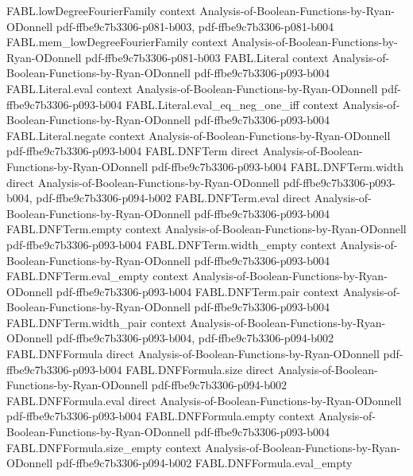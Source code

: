 \begin{theorem}
\proofstep
  {FABL.lowDegreeFourierFamily}
  {context}
  {Analysis-of-Boolean-Functions-by-Ryan-ODonnell}
  {pdf-ffbe9c7b3306-p081-b003,
    pdf-ffbe9c7b3306-p081-b004}
\proofstep
  {FABL.mem_lowDegreeFourierFamily}
  {context}
  {Analysis-of-Boolean-Functions-by-Ryan-ODonnell}
  {pdf-ffbe9c7b3306-p081-b003}
\proofstep
  {FABL.Literal}
  {context}
  {Analysis-of-Boolean-Functions-by-Ryan-ODonnell}
  {pdf-ffbe9c7b3306-p093-b004}
\proofstep
  {FABL.Literal.eval}
  {context}
  {Analysis-of-Boolean-Functions-by-Ryan-ODonnell}
  {pdf-ffbe9c7b3306-p093-b004}
\proofstep
  {FABL.Literal.eval_eq_neg_one_iff}
  {context}
  {Analysis-of-Boolean-Functions-by-Ryan-ODonnell}
  {pdf-ffbe9c7b3306-p093-b004}
\proofstep
  {FABL.Literal.negate}
  {context}
  {Analysis-of-Boolean-Functions-by-Ryan-ODonnell}
  {pdf-ffbe9c7b3306-p093-b004}
\proofstep
  {FABL.DNFTerm}
  {direct}
  {Analysis-of-Boolean-Functions-by-Ryan-ODonnell}
  {pdf-ffbe9c7b3306-p093-b004}
\proofstep
  {FABL.DNFTerm.width}
  {direct}
  {Analysis-of-Boolean-Functions-by-Ryan-ODonnell}
  {pdf-ffbe9c7b3306-p093-b004,
    pdf-ffbe9c7b3306-p094-b002}
\proofstep
  {FABL.DNFTerm.eval}
  {direct}
  {Analysis-of-Boolean-Functions-by-Ryan-ODonnell}
  {pdf-ffbe9c7b3306-p093-b004}
\proofstep
  {FABL.DNFTerm.empty}
  {context}
  {Analysis-of-Boolean-Functions-by-Ryan-ODonnell}
  {pdf-ffbe9c7b3306-p093-b004}
\proofstep
  {FABL.DNFTerm.width_empty}
  {context}
  {Analysis-of-Boolean-Functions-by-Ryan-ODonnell}
  {pdf-ffbe9c7b3306-p093-b004}
\proofstep
  {FABL.DNFTerm.eval_empty}
  {context}
  {Analysis-of-Boolean-Functions-by-Ryan-ODonnell}
  {pdf-ffbe9c7b3306-p093-b004}
\proofstep
  {FABL.DNFTerm.pair}
  {context}
  {Analysis-of-Boolean-Functions-by-Ryan-ODonnell}
  {pdf-ffbe9c7b3306-p093-b004}
\proofstep
  {FABL.DNFTerm.width_pair}
  {context}
  {Analysis-of-Boolean-Functions-by-Ryan-ODonnell}
  {pdf-ffbe9c7b3306-p093-b004,
    pdf-ffbe9c7b3306-p094-b002}
\proofstep
  {FABL.DNFFormula}
  {direct}
  {Analysis-of-Boolean-Functions-by-Ryan-ODonnell}
  {pdf-ffbe9c7b3306-p093-b004}
\proofstep
  {FABL.DNFFormula.size}
  {direct}
  {Analysis-of-Boolean-Functions-by-Ryan-ODonnell}
  {pdf-ffbe9c7b3306-p094-b002}
\proofstep
  {FABL.DNFFormula.eval}
  {direct}
  {Analysis-of-Boolean-Functions-by-Ryan-ODonnell}
  {pdf-ffbe9c7b3306-p093-b004}
\proofstep
  {FABL.DNFFormula.empty}
  {context}
  {Analysis-of-Boolean-Functions-by-Ryan-ODonnell}
  {pdf-ffbe9c7b3306-p093-b004}
\proofstep
  {FABL.DNFFormula.size_empty}
  {context}
  {Analysis-of-Boolean-Functions-by-Ryan-ODonnell}
  {pdf-ffbe9c7b3306-p094-b002}
\proofstep
  {FABL.DNFFormula.eval_empty}

\end{theorem}
